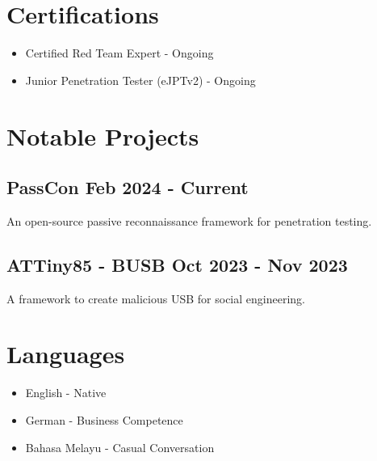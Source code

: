\documentclass[a4paper,10pt]{article}
\begin{document}
	\section*{ Certifications}
	\begin{itemize}[label=]
		\item Certified Red Team Expert - Ongoing
		\item Junior Penetration Tester (eJPTv2) - Ongoing
	\end{itemize}
	
	\section*{ Notable Projects}
	\subsection*{PassCon \hfill Feb 2024 - Current}
	An open-source passive reconnaissance framework for penetration testing.
	
	\subsection*{ATTiny85 - BUSB  \hfill Oct 2023 - Nov 2023}
	A framework to create malicious USB for social engineering.
	
	\section*{ Languages}
	\begin{itemize}[label=]
		\item English - Native
		\item German - Business Competence
		\item Bahasa Melayu - Casual Conversation
	\end{itemize}
\end{document}
